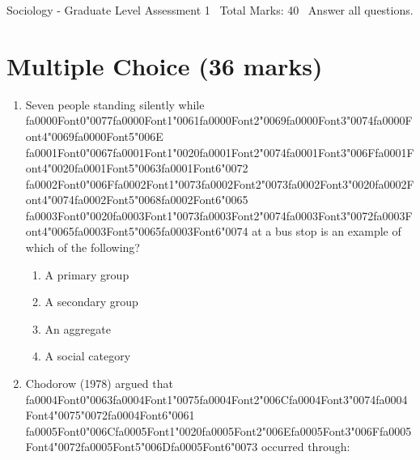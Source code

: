 \documentclass[12pt]{article}
\begin{document}
\begin{center}
Sociology - Graduate Level Assessment 1 \
Total Marks: 40 \
Answer all questions.
\end{center}

\section*{Multiple Choice (36 marks)}
\begin{enumerate}[label=\arabic*.]
\item Seven people standing silently while {\csname fa0000Font0\endcsname\char"0077}{\csname fa0000Font1\endcsname\char"0061}{\csname fa0000Font2\endcsname\char"0069}{\csname fa0000Font3\endcsname\char"0074}{\csname fa0000Font4\endcsname\char"0069}{\csname fa0000Font5\endcsname\char"006E} {\csname fa0001Font0\endcsname\char"0067}{\csname fa0001Font1\endcsname\char"0020}{\csname fa0001Font2\endcsname\char"0074}{\csname fa0001Font3\endcsname\char"006F}{\csname fa0001Font4\endcsname\char"0020}{\csname fa0001Font5\endcsname\char"0063}{\csname fa0001Font6\endcsname\char"0072} {\csname fa0002Font0\endcsname\char"006F}{\csname fa0002Font1\endcsname\char"0073}{\csname fa0002Font2\endcsname\char"0073}{\csname fa0002Font3\endcsname\char"0020}{\csname fa0002Font4\endcsname\char"0074}{\csname fa0002Font5\endcsname\char"0068}{\csname fa0002Font6\endcsname\char"0065} {\csname fa0003Font0\endcsname\char"0020}{\csname fa0003Font1\endcsname\char"0073}{\csname fa0003Font2\endcsname\char"0074}{\csname fa0003Font3\endcsname\char"0072}{\csname fa0003Font4\endcsname\char"0065}{\csname fa0003Font5\endcsname\char"0065}{\csname fa0003Font6\endcsname\char"0074} at a bus stop is an example of which of the following?
\begin{enumerate}[label=(\alph*)]
    \item A primary group
    \item A secondary group
    \item An aggregate
    \item A social category
\end{enumerate}
\item Chodorow (1978) argued that {\csname fa0004Font0\endcsname\char"0063}{\csname fa0004Font1\endcsname\char"0075}{\csname fa0004Font2\endcsname\char"006C}{\csname fa0004Font3\endcsname\char"0074}{\csname fa0004Font4\endcsname\char"0075}{\char"0072}{\csname fa0004Font6\endcsname\char"0061} {\csname fa0005Font0\endcsname\char"006C}{\csname fa0005Font1\endcsname\char"0020}{\csname fa0005Font2\endcsname\char"006E}{\csname fa0005Font3\endcsname\char"006F}{\csname fa0005Font4\endcsname\char"0072}{\csname fa0005Font5\endcsname\char"006D}{\csname fa0005Font6\endcsname\char"0073} occurred through:

\end{enumerate}
\end{document}
